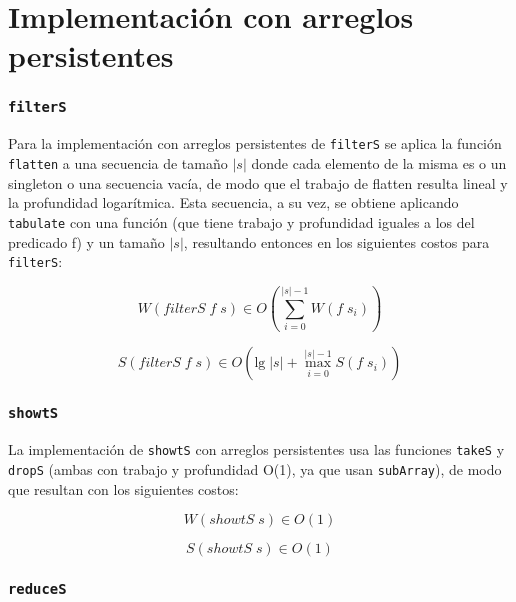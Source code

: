 \documentclass[a4paper,10pt]{article}
\begin{document}
\part*{Implementación con arreglos persistentes}

\section*{\texttt{filterS}}

Para la implementación con arreglos persistentes de \texttt{filterS} se aplica
la función \texttt{flatten} a una secuencia de tamaño $\vert s \vert$ donde cada
elemento de la misma es o un singleton o una secuencia vacía, de modo que el
trabajo de flatten resulta lineal y la profundidad logarítmica. Esta secuencia,
a su vez, se obtiene aplicando \texttt{tabulate} con una función (que tiene
trabajo y profundidad iguales a los del predicado f) y un tamaño $\vert s \vert$,
resultando entonces en los siguientes costos para \texttt{filterS}:

\begin{equation*}
    W \left( filterS \; f \; s \right) \in
    O \left( \sum_{i=0}^{\vert s \vert -1} W(f \; s_i) \right)
\end{equation*}

\begin{equation*}
    S \left( filterS \; f \; s \right) \in
    O \left( \text{lg} \; \vert s \vert + \max_{i=0}^{\vert s \vert -1} S(f \; s_i) \right)
\end{equation*}


\section*{\texttt{showtS}}

La implementación de \texttt{showtS} con arreglos persistentes usa las funciones
\texttt{takeS} y \texttt{dropS} (ambas con trabajo y profundidad O(1), ya que usan
\texttt{subArray}), de modo que resultan con los siguientes costos:

\begin{equation*}
    W \left( showtS \; s \right) \in
    O \left( 1 \right)
\end{equation*}

\begin{equation*}
    S \left( showtS \; s \right) \in
    O \left( 1 \right)
\end{equation*}


\section*{\texttt{reduceS}}
\end{document}
